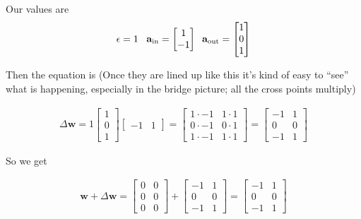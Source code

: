 Our values are
\begin{equation*}
\epsilon = 1 \; \; \; \; \\
\mathbf{a}_{\text{in}} = \begin{bmatrix} 1 \\ -1 \end{bmatrix} \\ 
\; \; \mathbf{a}_{\text{out}} = \begin{bmatrix} 1 \\ 0 \\ 1 \end{bmatrix}
\end{equation*}

Then the equation is (Once they are lined up like this it's kind of easy to ``see'' what is happening, especially in the bridge picture; all the cross points multiply)

\begin{align*}
\Delta \mathbf{w}  = 1
\begin{bmatrix} 1 \\ 0 \\ 1 \end{bmatrix} 
\begin{bmatrix} -1 & 1 \end{bmatrix} 
= \begin{bmatrix} 1 \cdot -1 & 1 \cdot 1 \\ 0 \cdot -1 & 0 \cdot 1 \\ 1 \cdot -1 & 1 \cdot 1 \end{bmatrix} 
= \begin{bmatrix} -1 & 1 \\ 0 & 0 \\  -1 & 1  \end{bmatrix}
\end{align*}

So we get

\begin{align*}
\mathbf{w} + \Delta \mathbf{w}  =
\begin{bmatrix} 0 & 0 \\ 0 & 0 \\  0  & 0  \end{bmatrix} +
\begin{bmatrix} -1 & 1 \\ 0 & 0 \\  -1 & 1  \end{bmatrix} =
\begin{bmatrix} -1 & 1 \\ 0 & 0 \\  -1 & 1  \end{bmatrix}
\end{align*}

